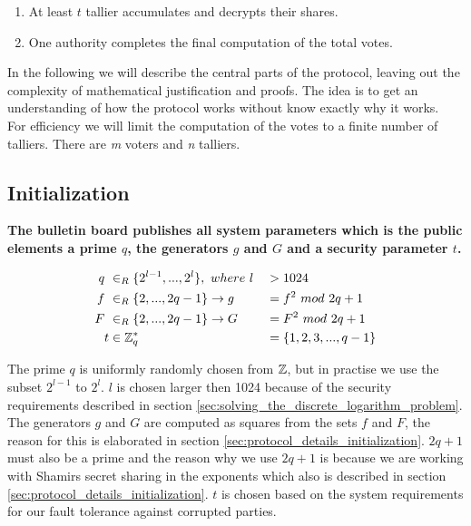 \begin{enumerate}
        \begin{enumerate}
            \item At least $t$ tallier accumulates and decrypts their shares.
            
            \item One authority completes the final computation of the total votes.
        \end{enumerate}
\end{enumerate}


\noindent
In the following we will describe the central parts of the protocol, leaving out the complexity of mathematical justification and proofs. The idea is to get an understanding of how the protocol works without know exactly why it works. \\

\noindent
For efficiency we will limit the computation of the votes to a finite number of talliers. There are \textit{m} voters and \textit{n} talliers. 
\subsection{Initialization}   \label{sec:the_protocol_initialization}

\noindent
\textbf{The bulletin board publishes all system parameters which is the public elements a prime $q$,  the generators $g$ and $G$ and a security parameter $t$.}


\begin{alignat*}{2}
q \ &\in_R \{2^{l-1},...,2^{l}\}, \ where\  l &&> 1024 \\
f \ &\in_R \{2,...,2q-1\} \rightarrow g &&= f^2 \ mod\ 2q+1  \\
F \ &\in_R \{2,...,2q-1\}\rightarrow G &&= F^2 \ mod\ 2q+1 \\
t &\in \Z_q^* &&= \{1,2,3,...,q-1\} 
\end{alignat*}

\noindent
The prime $q$ is uniformly randomly chosen from $\mathbb{Z}$, but in practise we use the subset $2^{l-1}$ to $2^l$. $l$ is chosen  larger then 1024 because of the security requirements described in section \ref{sec:solving_the_discrete_logarithm_problem}. The generators $g$ and $G$ are computed as squares from the sets $f$ and $F$, the reason for this is elaborated in section \ref{sec:protocol_details_initialization}.  $2q+1$ must also be a prime and the reason why we use $2q +1$ is because we are working with Shamirs secret sharing in the exponents which also is described in section \ref{sec:protocol_details_initialization}. $t$ is chosen based on the system requirements for our fault tolerance against corrupted parties.\\

